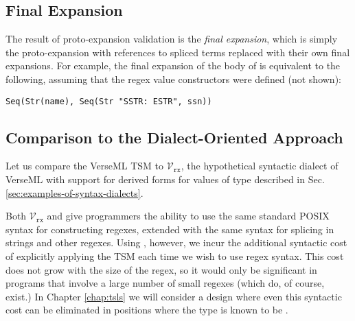 

\subsection{Final Expansion}
The result of proto-expansion validation is the \emph{final expansion}, which is simply the proto-expansion with  references to spliced terms replaced with their own final expansions. For example, the final expansion of the body of  is equivalent to the following, assuming that the regex value constructors were defined (not shown):
\begin{lstlisting}[numbers=none]
Seq(Str(name), Seq(Str "SSTR: ESTR", ssn))
\end{lstlisting}

\subsection{Comparison to the Dialect-Oriented Approach}
Let us compare the VerseML TSM  to $\mathcal{V}_\texttt{rx}$, the hypothetical syntactic dialect of VerseML with support for derived forms for values of type  described in Sec. \ref{sec:examples-of-syntax-dialects}.

Both $\mathcal{V}_\texttt{rx}$ and  give programmers the ability to use the same standard POSIX syntax for constructing regexes, extended with the same syntax for splicing in strings and other regexes. Using , however, we incur the additional syntactic cost of explicitly applying the  TSM each time we wish to use regex syntax. This cost does not grow with the size of the regex, so it would only be significant in programs that involve a large number of small regexes (which do, of course, exist.) In Chapter \ref{chap:tsls} we will consider a design where even this syntactic cost can be eliminated in  positions where the type is known to be .

